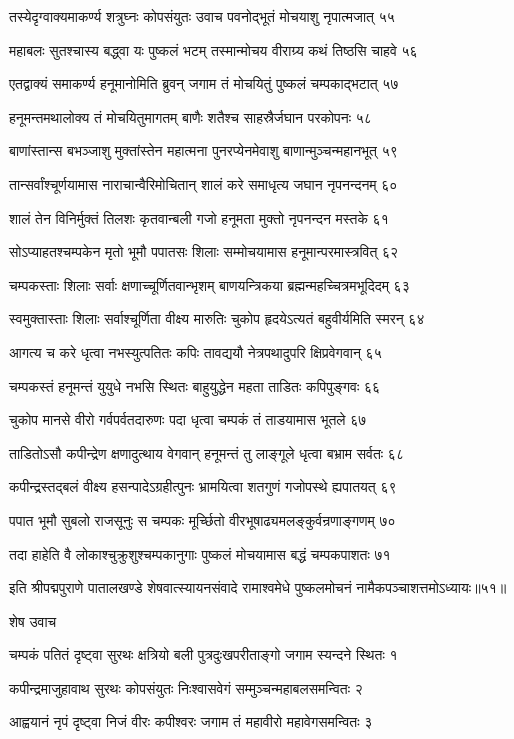 तस्येदृग्वाक्यमाकर्ण्य शत्रुघ्नः कोपसंयुतः
उवाच पवनोद्भूतं मोचयाशु नृपात्मजात् ५५

महाबलः सुतश्चास्य बद्ध्वा यः पुष्कलं भटम्
तस्मान्मोचय वीराग्र्य कथं तिष्ठसि चाहवे ५६

एतद्वाक्यं समाकर्ण्य हनूमानोमिति ब्रुवन्
जगाम तं मोचयितुं पुष्कलं चम्पकाद्भटात् ५७

हनूमन्तमथालोक्य तं मोचयितुमागतम्
बाणैः शतैश्च साहस्रैर्जघान परकोपनः ५८

बाणांस्तान्स बभञ्जाशु मुक्तांस्तेन महात्मना
पुनरप्येनमेवाशु बाणान्मुञ्चन्महानभूत् ५९

तान्सर्वांश्चूर्णयामास नाराचान्वैरिमोचितान्
शालं करे समाधृत्य जघान नृपनन्दनम् ६०

शालं तेन विनिर्मुक्तं तिलशः कृतवान्बली
गजो हनूमता मुक्तो नृपनन्दन मस्तके ६१

सोऽप्याहतश्चम्पकेन मृतो भूमौ पपातसः
शिलाः सम्मोचयामास हनूमान्परमास्त्रवित् ६२

चम्पकस्ताः शिलाः सर्वाः क्षणाच्चूर्णितवान्भृशम्
बाणयन्त्रिकया ब्रह्मन्महच्चित्रमभूदिदम् ६३

स्वमुक्तास्ताः शिलाः सर्वाश्चूर्णिता वीक्ष्य मारुतिः
चुकोप हृदयेऽत्यतं बहुवीर्यमिति स्मरन् ६४

आगत्य च करे धृत्वा नभस्युत्पतितः कपिः
तावद्ययौ नेत्रपथादुपरि क्षिप्रवेगवान् ६५

चम्पकस्तं हनूमन्तं युयुधे नभसि स्थितः
बाहुयुद्धेन महता ताडितः कपिपुङ्गवः ६६

चुकोप मानसे वीरो गर्वपर्वतदारुणः
पदा धृत्वा चम्पकं तं ताडयामास भूतले ६७

ताडितोऽसौ कपीन्द्रेण क्षणादुत्थाय वेगवान्
हनूमन्तं तु लाङ्गूले धृत्वा बभ्राम सर्वतः ६८

कपीन्द्रस्तद्बलं वीक्ष्य हसन्पादेऽग्रहीत्पुनः
भ्रामयित्वा शतगुणं गजोपस्थे ह्यपातयत् ६९

पपात भूमौ सुबलो राजसूनुः स चम्पकः
मूर्च्छितो वीरभूषाढ्यमलङ्कुर्वन्रणाङ्गणम् ७०

तदा हाहेति वै लोकाश्चुक्रुशुश्चम्पकानुगाः
पुष्कलं मोचयामास बद्धं चम्पकपाशतः ७१

इति श्रीपद्मपुराणे पातालखण्डे शेषवात्स्यायनसंवादे रामाश्वमेधे पुष्कलमोचनं नामैकपञ्चाशत्तमोऽध्यायः॥५१॥


शेष उवाच

चम्पकं पतितं दृष्ट्वा सुरथः क्षत्रियो बली
पुत्रदुःखपरीताङ्गो जगाम स्यन्दने स्थितः १

कपीन्द्रमाजुहावाथ सुरथः कोपसंयुतः
निःश्वासवेगं सम्मुञ्चन्महाबलसमन्वितः २

आह्वयानं नृपं दृष्ट्वा निजं वीरः कपीश्वरः
जगाम तं महावीरो महावेगसमन्वितः ३

